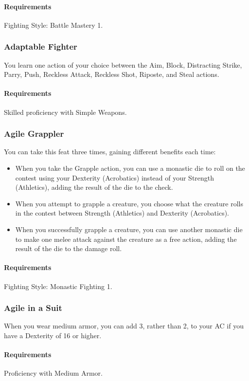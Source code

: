     \paragraph{Requirements} Fighting Style: Battle Mastery 1.
\subsubsection{Adaptable Fighter} \label{feat::adaptablefighter}
    You learn one action of your choice between the Aim, Block, Distracting Strike, Parry, Push, Reckless Attack, Reckless Shot, Riposte, and Steal actions.
    \paragraph{Requirements} Skilled proficiency with Simple Weapons.
\subsubsection{Agile Grappler} \label{feat::agilegrappler}
    You can take this feat three times, gaining different benefits each time:
    \begin{itemize}
        \item When you take the Grapple action, you can use a monastic die to roll on the contest using your Dexterity (Acrobatics) instead of your Strength (Athletics), adding the result of the die to the check.
        \item When you attempt to grapple a creature, you choose what the creature rolls in the contest between Strength (Athletics) and Dexterity (Acrobatics).
        \item When you successfully grapple a creature, you can use another monastic die to make one melee attack against the creature as a free action, adding the result of the die to the damage roll.
    \end{itemize}
    \paragraph{Requirements} Fighting Style: Monastic Fighting 1.
\subsubsection{Agile in a Suit} \label{feat::agileinasuit}
    When you wear medium armor, you can add 3, rather than 2, to your AC if you have a Dexterity of 16 or higher.
    \paragraph{Requirements} Proficiency with Medium Armor.
